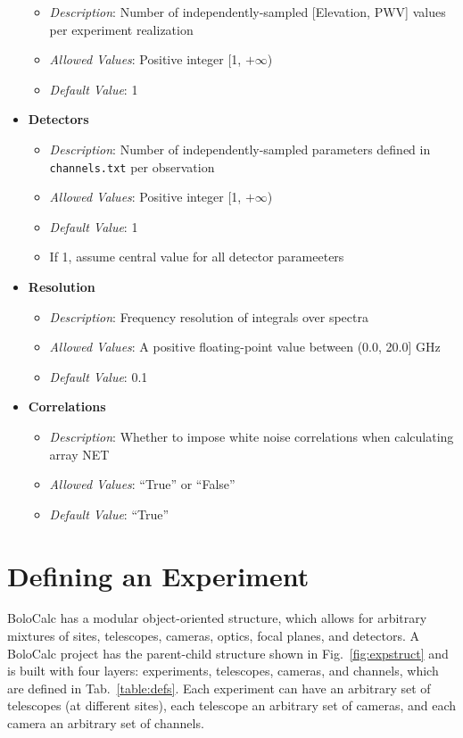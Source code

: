 \documentclass[11pt]{article} %
\begin{document}
\begin{itemize}[noitemsep,topsep=0pt]
\begin{itemize}[noitemsep,topsep=0pt]
		\item \textit{Description}: Number of independently-sampled [Elevation, PWV] values per experiment realization 
		\item \textit{Allowed Values}: Positive integer [1, $+\infty$)
		\item \textit{Default Value}: 1
		\end{itemize}
	\item \textbf{Detectors}
		\begin{itemize}[noitemsep,topsep=0pt]
		\item \textit{Description}: Number of independently-sampled parameters defined in \texttt{channels.txt} per observation
		\item \textit{Allowed Values}: Positive integer [1, $+\infty$)
		\item \textit{Default Value}: 1
		\item If 1, assume central value for all detector parameeters
		\end{itemize}
	\item \textbf{Resolution}
		\begin{itemize}[noitemsep,topsep=0pt]
		\item \textit{Description}: Frequency resolution of integrals over spectra
		\item \textit{Allowed Values}: A positive floating-point value between (0.0, 20.0] GHz
		\item \textit{Default Value}: 0.1
		\end{itemize}
	\item \textbf{Correlations}
		\begin{itemize}[noitemsep,topsep=0pt]
		\item \textit{Description}: Whether to impose white noise correlations when calculating array NET
		\item \textit{Allowed Values}: ``True'' or ``False''
		\item \textit{Default Value}: ``True''
		\end{itemize}
\end{itemize}
\fi

\section{Defining an Experiment}
\label{sec:defexp}

BoloCalc has a modular object-oriented structure, which allows for arbitrary mixtures of sites, telescopes, cameras, optics, focal planes, and detectors. A BoloCalc project has the parent-child structure shown in Fig.~\ref{fig:expstruct} and is built with four layers: experiments, telescopes, cameras, and channels, which are defined in Tab.~\ref{table:defs}. Each experiment can have an arbitrary set of telescopes (at different sites), each telescope an arbitrary set of cameras, and each camera an arbitrary set of channels.
\end{document}
